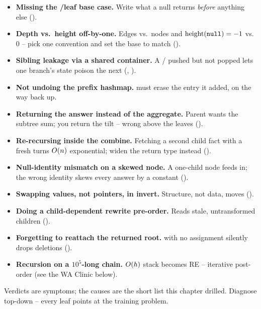 \begin{itemize}[nosep, leftmargin=1.4em]
  \item \textbf{Missing the \nil{}/leaf base case.} Write what a null returns
        \emph{before} anything else ().
  \item \textbf{Depth vs.\ height off-by-one.} Edges vs.\ nodes and $\operatorname{height}(\texttt{null})=-1$
        vs.\ $0$ -- pick one convention and set the base to match ().
  \item \textbf{Sibling leakage via a shared container.} A /
        pushed but not popped lets one branch's state poison the next
        (, ).
  \item \textbf{Not undoing the prefix hashmap.}  must erase
        the entry it added, on the way back up.
  \item \textbf{Returning the answer instead of the aggregate.} Parent wants the
        subtree sum; you return the tilt -- wrong above the leaves ().
  \item \textbf{Re-recursing inside the combine.} Fetching a second child fact with a
        fresh  turns $O(n)$ exponential; widen the return type instead
        ().
  \item \textbf{Null-identity mismatch on a skewed node.} A one-child node feeds
         in; the wrong identity skews every answer by a constant
        ().
  \item \textbf{Swapping values, not pointers, in invert.} Structure, not data,
        moves ().
  \item \textbf{Doing a child-dependent rewrite pre-order.} Reads stale, untransformed
        children ().
  \item \textbf{Forgetting to reattach the returned root.}  with no
        assignment silently drops deletions ().
  \item \textbf{Recursion on a $10^{5}$-long chain.} $O(h)$ stack becomes RE --
        iterative post-order (see the WA Clinic below).
\end{itemize}


Verdicts are symptoms; the causes are the short list this chapter drilled. Diagnose
top-down -- every leaf points at the training problem.


